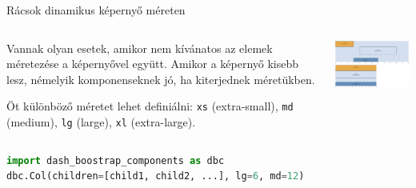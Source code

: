 \documentclass[english, aspectratio=169]{beamer}
\begin{document}
\begin{frame}[fragile]{Rácsok dinamikus képernyő méreten}
	\begin{columns}
		\begin{column}{.4\textwidth}
			Vannak olyan esetek, amikor nem kívánatos az elemek méretezése a képernyővel együtt. Amikor a képernyő kisebb lesz, némelyik komponenseknek jó, ha kiterjednek méretükben.\par\smallskip
			Öt különböző méretet lehet definiálni: \texttt{xs} (extra-small), \texttt{md} (medium), \texttt{lg} (large), \texttt{xl} (extra-large).
		\end{column}
		\begin{column}{.6\textwidth}
			\begin{center}
				\includegraphics[width=7cm, keepaspectratio]{images/dash_10.png}
			\end{center}
		\end{column}
	\end{columns}
	\vspace{0.2cm}
	\begin{center}
		\begin{lstlisting}[language=python]
import dash_boostrap_components as dbc
dbc.Col(children=[child1, child2, ...], lg=6, md=12)
		\end{lstlisting}
	\end{center}
\end{frame}
\end{document}
